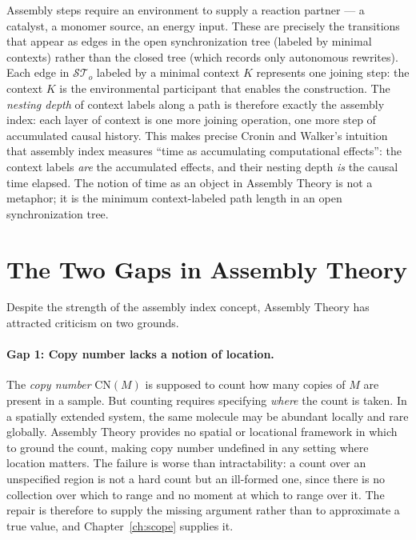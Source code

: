\begin{remark}
Assembly steps require an environment to supply a reaction partner ---
a catalyst, a monomer source, an energy input.
These are precisely the transitions that appear as edges in the
open synchronization tree (labeled by minimal contexts) rather than
the closed tree (which records only autonomous rewrites).
Each edge in $\mathcal{ST}_o$ labeled by a minimal context $K$
represents one joining step: the context $K$ is the environmental
participant that enables the construction.
The \emph{nesting depth} of context labels along a path is
therefore exactly the assembly index: each layer of context is
one more joining operation, one more step of accumulated causal
history.
This makes precise Cronin and Walker's intuition that assembly
index measures ``time as accumulating computational effects'':
the context labels \emph{are} the accumulated effects, and their
nesting depth \emph{is} the causal time elapsed.
The notion of time as an object in Assembly Theory is not a
metaphor; it is the minimum context-labeled path length in an
open synchronization tree.
\end{remark}

\section{The Two Gaps in Assembly Theory}
Despite the strength of the assembly index concept, Assembly Theory
has attracted criticism on two grounds.

\paragraph{Gap 1: Copy number lacks a notion of location.}
The \emph{copy number} $\mathrm{CN}(M)$ is supposed to count how
many copies of $M$ are present in a sample.
But counting requires specifying \emph{where} the count is taken.
In a spatially extended system, the same molecule may be abundant
locally and rare globally.
Assembly Theory provides no spatial or locational framework in which
to ground the count, making copy number undefined in any setting
where location matters.
The failure is worse than intractability: a count over an
unspecified region is not a hard count but an ill-formed one, since
there is no collection over which to range and no moment at which to
range over it.
The repair is therefore to supply the missing argument rather than
to approximate a true value, and Chapter~\ref{ch:scope} supplies it.

